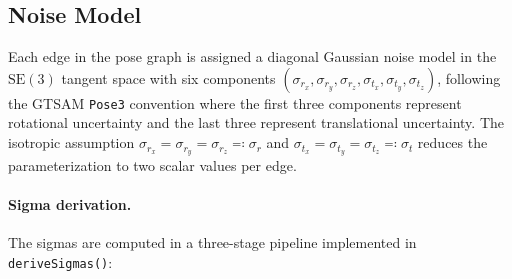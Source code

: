 \subsection{Noise Model}
\label{sec:noise_model}

Each edge in the pose graph is assigned a diagonal Gaussian noise model in
the $\mathrm{SE}(3)$ tangent space with six components
$(\sigma_{r_x}, \sigma_{r_y}, \sigma_{r_z}, \sigma_{t_x}, \sigma_{t_y},
\sigma_{t_z})$, following the GTSAM \texttt{Pose3} convention where the
first three components represent rotational uncertainty and the last three
represent translational uncertainty.
The isotropic assumption
$\sigma_{r_x} = \sigma_{r_y} = \sigma_{r_z} \eqqcolon \sigma_r$ and
$\sigma_{t_x} = \sigma_{t_y} = \sigma_{t_z} \eqqcolon \sigma_t$ reduces
the parameterization to two scalar values per edge.

\paragraph{Sigma derivation.}
The sigmas are computed in a three-stage pipeline implemented in
\texttt{deriveSigmas()}:

